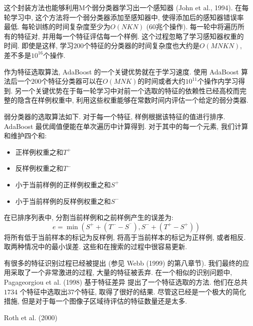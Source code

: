 \documentclass[utf8]{ctexart}
\begin{document}
这个封装方法也能够利用M个弱分类器学习出一个感知器 (John et al., 1994). 在每轮学习中, 这个方法将一个弱分类器添加至感知器中, 使得添加后的感知器错误率最低. 每轮训练的时间复杂度至少为$O(NKN)$ ($60$兆个操作). 每一轮中将遍历所有的特征对, 并用每一个特征评估每一个样例.
这个过程忽略了学习感知器权重的时间. 即使是这样, 学习$200$个特征的分类器的时间复杂度也大约是$O(MNKN)$, 差不多是$10^{16}$个操作.

作为特征选取算法, AdaBoost 的一个关键优势就在于学习速度. 使用 AdaBoost 算法后一个$200$个特征分类器可以在$O(MNK)$的时间或者大约$10^{11}$个操作内学习得到. 另一个关键优势在于每一轮学习中对前一个选取的特征的依赖性已经高校而完整的隐含在样例权重中, 利用这些权重能够在常数时间内评估一个给定的弱分类器.

弱分类器的选取算法如下. 对于每一个特征, 样例根据该特征的值进行排序. AdaBoost 最优阈值便能在单次遍历中计算得到. 对于其中的每一个元素, 我们计算和维护四个和:
\begin{itemize}
\item 正样例权重之和$T^+$
\item 反样例权重之和$T^-$
\item 小于当前样例的正样例权重之和$S^+$
\item 小于当前样例的反样例权重之和$S^-$
\end{itemize}
在已排序列表中, 分割当前样例和之前样例产生的误差为:
\[
e=\min(S^++(T^--S^^-),S^-+(T^+-S^+))
\]
将所有低于当前样本的标记为反样例, 将高于当前样本的标记为正样例, 或者相反. 取两种情况中的最小误差. 这些和在搜索的过程中很容易更新.

有很多的特征识别过程已经被提出 (参见 Webb (1999) 的第八章节). 我们最终的应用采取了一个非常激进的过程, 大量的特征被丢弃. 在一个相似的识别问题中,  Pagageorgiou et al. (1998) 基于特征差异
提出了一个特征选取的方法. 他们在总共 $1734$ 个特征中选取出$37$个特征, 取得了很好的结果. 尽管这已经是一个极大的简化措施, 但是对于每一个图像子区域待评估的特征数量还是太多.

Roth et al. (2000) 
\end{document}
